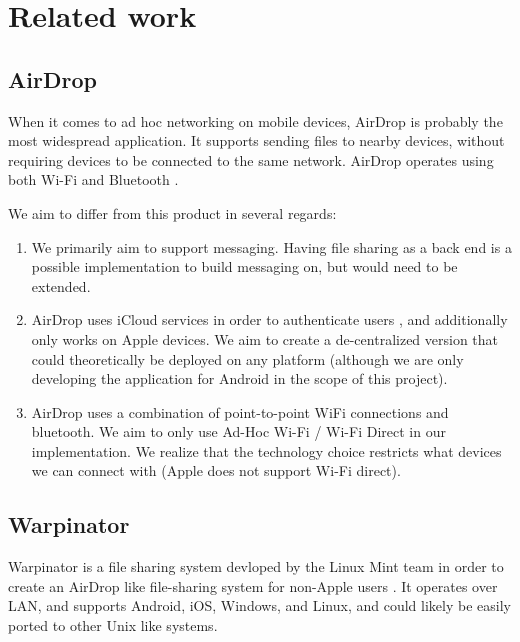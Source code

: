 \documentclass[10pt]{article}
\begin{document}
\newpage

\section{Related work}

\subsection{AirDrop}

When it comes to ad hoc networking on mobile devices, AirDrop is probably the most widespread application. It supports sending files to nearby devices, without requiring devices to be connected to the same network. AirDrop operates using both Wi-Fi and Bluetooth \cite{AppleSupport}.

We aim to differ from this product in several regards:
\begin{enumerate}
    \item We primarily aim to support messaging. Having file sharing as a back end is a possible implementation to build messaging on, but would need to be extended.
    \item AirDrop uses iCloud services in order to authenticate users \cite{AppleSupportSecurity}, and additionally only works on Apple devices. We aim to create a de-centralized version that
          could theoretically be deployed on any platform (although we are only developing the application for Android in the scope of this project).
    \item AirDrop uses a combination of point-to-point WiFi connections and bluetooth. We aim to only use Ad-Hoc Wi-Fi / Wi-Fi Direct in our implementation. We realize that the technology choice restricts what devices we can connect with (Apple does not support Wi-Fi direct).
\end{enumerate}

\subsection{Warpinator}

Warpinator is a file sharing system devloped by the Linux Mint team in order to create an AirDrop like file-sharing system for non-Apple users  \cite{Webster2023linuxmint}. It operates over
LAN, and supports Android, iOS, Windows, and Linux, and could likely be easily ported to other Unix like systems.
\end{document}
